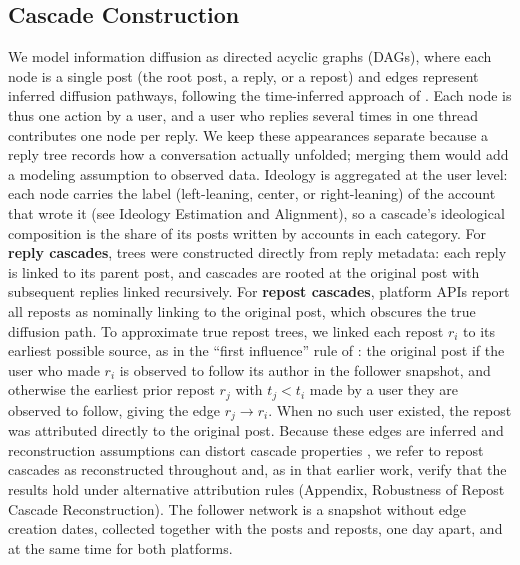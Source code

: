 \documentclass[letterpaper]{article} %
\newcommand{\rev}[1]{{\color{blue}#1}}
\begin{document}
\subsection{Cascade Construction}
We model information diffusion as directed acyclic graphs (DAGs), where \rev{each node is a single post (the root post, a reply, or a repost)} and edges represent inferred diffusion pathways, following the time-inferred approach of \citet{vosoughi_spread_2018}. \rev{Each node is thus one action by a user, and a user who replies several times in one thread contributes one node per reply. We keep these appearances separate because a reply tree records how a conversation actually unfolded; merging them would add a modeling assumption to observed data. Ideology is aggregated at the user level: each node carries the label (left-leaning, center, or right-leaning) of the account that wrote it (see Ideology Estimation and Alignment), so a cascade's ideological composition is the share of its posts written by accounts in each category.} For \textbf{reply cascades}, trees were constructed directly from reply metadata: each reply is linked to its parent post, and cascades are rooted at the original post with subsequent replies linked recursively. For \textbf{repost cascades}, platform APIs report all reposts as nominally linking to the original post, which obscures the true diffusion path. To approximate true repost trees, \rev{we linked each repost $r_i$ to its earliest possible source, as in the ``first influence'' rule of \citet{bakshy_everyones_2011}: the original post if the user who made $r_i$ is observed to follow its author in the follower snapshot, and otherwise the earliest prior repost $r_j$ with $t_j < t_i$ made by a user they are observed to follow, giving the edge $r_j \rightarrow r_i$}. When no such user existed, the repost was attributed directly to the original post. \rev{Because these edges are inferred and reconstruction assumptions can distort cascade properties \citep{deverna_cascade_2024}, we refer to repost cascades as reconstructed throughout and, as in that earlier work, verify that the results hold under alternative attribution rules (Appendix, Robustness of Repost Cascade Reconstruction). The follower network is a snapshot without edge creation dates, collected together with the posts and reposts, one day apart, and at the same time for both platforms.}
\end{document}
